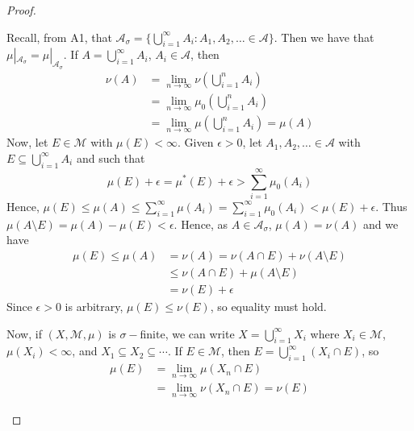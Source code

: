 \documentclass[12pt, a4paper]{memoir}
\theoremstyle{nonumberplain}
\newtheorem{proof}{Proof}
\begin{document}
\begin{proof}
\begin{enumerate}[label=(\roman*)]
            Recall, from A1, that $\mathcal{A}_\sigma=\{\bigcup_{i=1}^\infty A_i:A_1,A_2,\ldots\in\mathcal{A}\}$.
            Then we have that $\mu|_{\mathcal{A}_\sigma}=\mu|_{\mathcal{A}_\sigma}$.
            If $A=\bigcup_{i=1}^\infty A_i$, $A_i\in\mathcal{A}$, then
            \begin{align*}
                \nu(A) &= \lim_{n\to\infty} \nu\left(\bigcup_{i=1}^n A_i\right)\\
                       &= \lim_{n\to\infty} \mu_0\left(\bigcup_{i=1}^n A_i\right)\\
                       &= \lim_{n\to\infty}\mu\left(\bigcup_{i=1}^n A_i\right)=\mu(A)
            \end{align*}
            Now, let $E\in\mathcal{M}$ with $\mu(E)<\infty$.
            Given $\epsilon>0$, let $A_1,A_2,\ldots\in\mathcal{A}$ with $E\subseteq\bigcup_{i=1}^\infty A_i$ and such that
            \begin{equation*}
                \mu(E)+\epsilon=\mu^*(E)+\epsilon>\sum\limits_{i=1}^\infty\mu_0(A_i)
            \end{equation*}
            Hence, $\mu(E)\leq\mu(A)\leq\sum_{i=1}^\infty \mu(A_i)=\sum_{i=1}^\infty \mu_0(A_i)<\mu(E)+\epsilon$.
            Thus $\mu(A\setminus E)=\mu(A)-\mu(E)<\epsilon$.
            Hence, as $A\in\mathcal{A}_\sigma$, $\mu(A)=\nu(A)$ and we have
            \begin{align*}
                \mu(E)\leq\mu(A) &= \nu(A)=\nu(A\cap E)+\nu(A\setminus E)\\
                                 &\leq \nu(A\cap E)+\mu(A\setminus E)\\
                                 &= \nu(E)+\epsilon
            \end{align*}
            Since $\epsilon>0$ is arbitrary, $\mu(E)\leq\nu(E)$, so equality must hold.

            Now, if $(X,\mathcal{M},\mu)$ is $\sigma-$finite, we can write $X=\bigcup_{i=1}^\infty X_i$ where $X_i\in\mathcal{M}$, $\mu(X_i)<\infty$, and $X_1\subseteq X_2\subseteq\cdots$.
            If $E\in\mathcal{M}$, then $E=\bigcup_{i=1}^\infty(X_i\cap E)$, so
            \begin{align*}
                \mu(E) &= \lim_{n\to\infty}\mu(X_n\cap E)\\
                       &= \lim_{n\to\infty}\nu(X_n\cap E)=\nu(E)
            \end{align*}
    \end{enumerate}
\end{proof}
\end{document}
